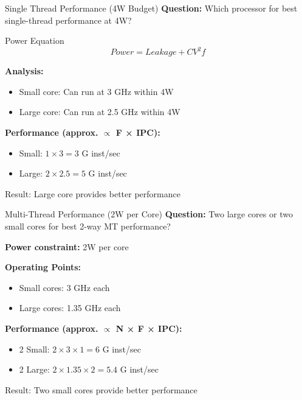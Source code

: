 \documentclass[aspectratio=169,12pt]{beamer}
\begin{document}
\begin{frame}{Single Thread Performance (4W Budget)}
\textbf{Question:} Which processor for best single-thread performance at 4W?

\begin{block}{Power Equation}
$$Power = Leakage + CV^2f$$
\end{block}

\textbf{Analysis:}
\begin{itemize}
    \item Small core: Can run at 3 GHz within 4W
    \item Large core: Can run at 2.5 GHz within 4W
\end{itemize}

\textbf{Performance (approx. $\propto$ F × IPC):}
\begin{itemize}
    \item Small: $1 \times 3 = 3$ G inst/sec
    \item Large: $2 \times 2.5 = 5$ G inst/sec
\end{itemize}

\alert{Result: Large core provides better performance}
\end{frame}

\begin{frame}{Multi-Thread Performance (2W per Core)}
\textbf{Question:} Two large cores or two small cores for best 2-way MT performance?

\textbf{Power constraint:} 2W per core

\textbf{Operating Points:}
\begin{itemize}
    \item Small cores: 3 GHz each
    \item Large cores: 1.35 GHz each
\end{itemize}

\textbf{Performance (approx. $\propto$ N × F × IPC):}
\begin{itemize}
    \item 2 Small: $2 \times 3 \times 1 = 6$ G inst/sec
    \item 2 Large: $2 \times 1.35 \times 2 = 5.4$ G inst/sec
\end{itemize}

\alert{Result: Two small cores provide better performance}
\end{frame}
\end{document}
